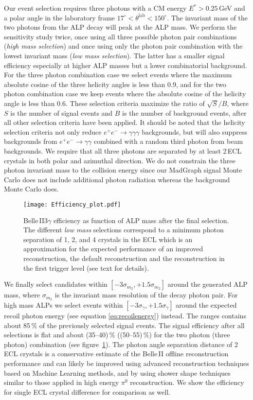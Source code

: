 \documentclass[11pt,a4paper]{article}
\def \belletwo {Belle\,II\xspace}
\begin{document}
Our event selection requires three photons with a CM energy $E^* > 0.25$\,GeV and a polar angle in the laboratory frame $17^{\circ} < \theta^{\text{lab}} < 150^{\circ}$. The invariant mass of the two photons from the ALP decay will peak at the ALP mass. We perform the sensitivity study twice, once using all three possible photon pair combinations (\textit{high mass selection}) and once using only the photon pair combination with the lowest invariant mass (\textit{low mass selection}). The latter has a smaller signal efficiency especially at higher ALP masses but a lower combinatorial background. For the three photon combination case we select events where the maximum absolute cosine of the three helicity angles is less than 0.9, and for the two photon combination case we keep events where the absolute cosine of the helicity angle is less than 0.6. These selection criteria maximize the ratio of $\sqrt{S}/B$, where $S$ is the number of signal events and $B$ is the number of background events, after all other selection criteria have been applied. It should be noted that the helicity selection criteria not only reduce $e^+e^-\to\gamma\gamma\gamma$ backgrounds, but will also suppress backgrounds from $e^+e^-\to\gamma\gamma$ combined with a random third photon from beam backgrounds. We require that all three photons are separated by at least 2\,ECL crystals in both polar and azimuthal direction. We do not constrain the three photon invariant mass to the collision energy since our MadGraph signal Monte Carlo does not include additional photon radiation whereas the background Monte Carlo does.

\begin{figure}
\centering
\texttt{[image: Efficiency\_plot.pdf]}
\caption{\label{fig:belle2_eff} \belletwo $3\gamma$ efficiency as function of ALP mass after the final selection. The different \textit{low mass} selections correspond to a minimum photon separation of 1, 2, and 4 crystals in the ECL which is an approximation for the expected performance of an improved reconstruction, the default reconstruction and the reconstruction in the first trigger level (see text for details).}
\end{figure}

We finally select candidates within $[-3\sigma_{m_2}, +1.5\sigma_{m_2}]$ around the generated ALP mass, where $\sigma_{m_2}$ is the invariant mass resolution of the decay photon pair. For high mass ALPs we select events within $[-3\sigma_{\gamma}, +1.5\sigma_{\gamma}]$ around the expected recoil photon energy (see equation \ref{eq:recoilenergy}) instead. The ranges contains about 85\,\% of the previously selected signal events. The signal efficiency after all selections is flat and about (35--40)\,\% ((50--55)\,\%) for the two photon (three photon) combination (see figure~\ref{fig:belle2_eff}). The photon angle separation distance of 2\,ECL crystals is a conservative estimate of the \belletwo offline reconstruction performance and can likely be improved using advanced reconstruction techniques based on Machine Learning methods, and by using shower shape techniques similar to those applied in high energy $\pi^0$ reconstruction. We show the efficiency for single ECL crystal difference for comparison as well.
\end{document}
